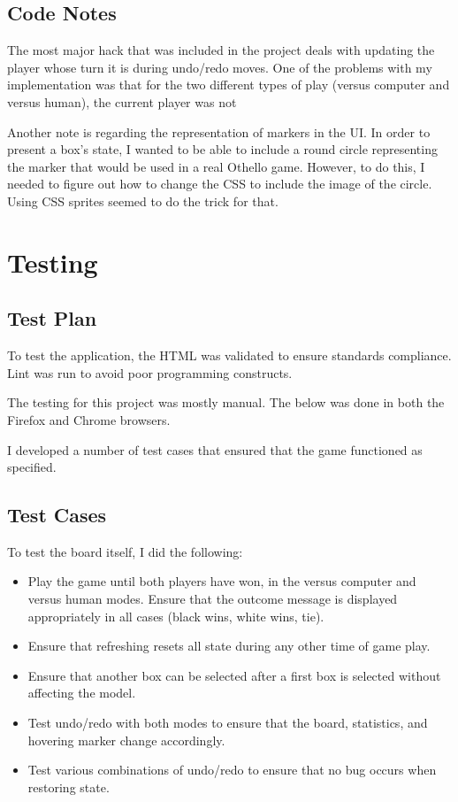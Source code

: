 \documentclass[11pt,letterpaper]{article}
\begin{document}
\subsection{Code Notes}
The most major hack that was included in the project deals with updating the player whose turn it is during undo/redo moves. One of the problems with my implementation was that for the two different types of play (versus computer and versus human), the current player was not 

Another note is regarding the representation of markers in the UI. In order to present a box's state, I wanted to be able to include a round circle representing the marker that would be used in a real Othello game. However, to do this, I needed to figure out how to change the CSS to include the image of the circle. Using CSS sprites seemed to do the trick for that.
\section{Testing}

\subsection{Test Plan}
To test the application, the HTML was validated to ensure standards compliance. Lint was run to avoid poor programming constructs.

The testing for this project was mostly manual. The below was done in both the Firefox and Chrome browsers.

I developed a number of test cases that ensured that the game functioned as specified.

\subsection{Test Cases}
To test the board itself, I did the following:
\begin{itemize}
\item Play the game until both players have won, in the versus computer and versus human modes. Ensure that the outcome message is displayed appropriately in all cases (black wins, white wins, tie).
\item Ensure that refreshing resets all state during any other time of game play.
\item Ensure that another box can be selected after a first box is selected without affecting the model.
\item Test undo/redo with both modes to ensure that the board, statistics, and hovering marker change accordingly.
\item Test various combinations of undo/redo to ensure that no bug occurs when restoring state.
\end{itemize}
\end{document}
